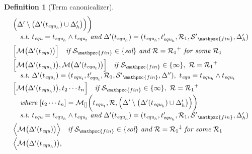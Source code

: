 \documentclass[12pt]{article}
\newtheorem{Definition}{Definition}[section]
\begin{document}
\begin{Definition}[Term canonicalizer]
\begin{displaymath}
\begin{array}{l}
\begin{array}{l}
         \Bigl(\Delta' \setminus \bigl(\Delta'(t_{\text{\it equ}_h}) \cup
          \Delta'_h \bigr) \Bigr) \biggr)  \\
      \quad \text{\it s.t.}\ t_{\text{\it equ}} = t_{\text{\it equ}_h}
       \wedge t_{\text{\it equ}_t}\ \text{\it and}\
        \Delta'(t_{\text{\it equ}_h}) = (t_{\text{\it equ}_h},
         t'_{\text{\it equ}_h}, \mathcal{R}_1, {\mathcal{S}'}_{\mathpzc{fin}},
          \Delta'_h)  \\ [5pt]
     \Bigl[\mathcal{M}\bigl(\Delta'(t_{\text{\it equ}}) \bigr) \Bigr]
      \quad \text{\it if}\ \mathcal{S}_{\mathpzc{fin}} \in
       \{\text{\it sol} \}\ \text{\it and}\
        \mathcal{R} = {\mathcal{R}_1}^+\ \text{\it for some}\
         \mathcal{R}_1  \\ [5pt]
     \Bigl[\mathcal{M}\bigl(\Delta'(t_{\text{\it equ}_h}) \bigr),
      \mathcal{M}\bigl(\Delta'(t_{\text{\it equ}_t}) \bigr) \Bigr]
       \quad \text{\it if}\ \mathcal{S}_{\mathpzc{fin}} \in \{\infty\},\
        \mathcal{R} = {\mathcal{R}_1}^+  \\
      \quad \text{\it s.t.}\ \Delta'(t_{\text{\it equ}_t}) =
       (t_{\text{\it equ}_t}, t'_{\text{\it equ}_t}, \mathcal{R}_1,
        {\mathcal{S}'}_{\mathpzc{fin}}, \Delta''),\ t_{\text{\it equ}} =
       t_{\text{\it equ}_h} \wedge t_{\text{\it equ}_t}  \\ [3pt]
     \Bigl[\mathcal{M}\bigl(\Delta'(t_{\text{\it equ}_h}) \bigr),
       t_2 \cdots t_n \Bigr]
      \quad \text{\it if}\ \mathcal{S}_{\mathpzc{fin}} \in \{\infty\},\
       \mathcal{R} = {\mathcal{R}_1}^+  \\
       \quad \text{\it where}\ [t_2 \cdots t_n] =
        \mathcal{M}_{[]}\biggl(t_{\text{\it equ}_t}, \mathcal{R},
         \Bigl(\Delta' \setminus \bigl(\Delta'(t_{\text{\it equ}_h}) \cup
          \Delta'_h \bigr) \Bigr) \biggr)  \\
      \quad \text{\it s.t.}\ t_{\text{\it equ}} = t_{\text{\it equ}_h}
       \wedge t_{\text{\it equ}_t}\ \text{\it and}\
        \Delta'(t_{\text{\it equ}_h}) = (t_{\text{\it equ}_h},
         t'_{\text{\it equ}_h}, \mathcal{R}_1, {\mathcal{S}'}_{\mathpzc{fin}},
          \Delta'_h)  \\ [5pt]
     \Bigl\langle\mathcal{M}\bigl(\Delta'(t_{\text{\it equ}}) \bigr)
      \Bigr\rangle \quad \text{\it if}\ \mathcal{S}_{\mathpzc{fin}} \in
       \{\text{\it sol} \}\ \text{\it and}\
        \mathcal{R} = {\mathcal{R}_1}^\downarrow\ \text{\it for some}\
         \mathcal{R}_1  \\ [5pt]
     \Bigl\langle\mathcal{M}\bigl(\Delta'(t_{\text{\it equ}_h}) \bigr),

\end{array}
\end{array}
\end{displaymath}
\end{Definition}
\end{document}

